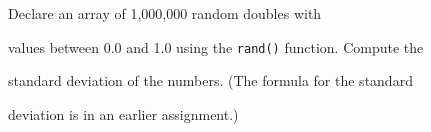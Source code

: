 Declare an array of 1,000,000 random doubles with

values between 0.0 and 1.0 using the \texttt{rand()} function. Compute the

standard deviation of the numbers. (The formula for the standard

deviation is in an earlier assignment.)

